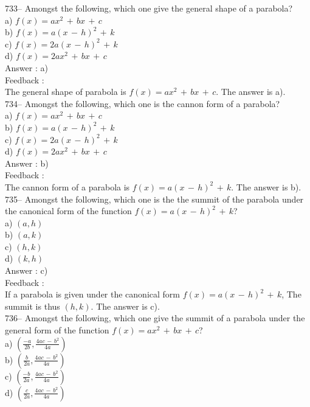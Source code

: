 \documentclass[letterpaper, 12pt]{article}
\begin{document}
733-- Amongst the following, which one give the general shape of a parabola?\\
a) $f(x)=ax^{2}\,+\,bx\,+\,c$\\
b) $f(x)=a(x\,-\,h)^{2}\,+\,k$\\
c) $f(x)=2a(x\,-\,h)^{2}\,+\,k$\\
d) $f(x)=2ax^{2}\,+\,bx\,+\,c$\\

Answer : a)\\

Feedback : \\
The general shape of parabola is $f(x)=ax^{2}\,+\,bx\,+\,c$. The answer is a).\\

734-- Amongst the following, which one is the cannon form of a parabola?\\
a) $f(x)=ax^{2}\,+\,bx\,+\,c$\\
b) $f(x)=a(x\,-\,h)^{2}\,+\,k$\\
c) $f(x)=2a(x\,-\,h)^{2}\,+\,k$\\
d) $f(x)=2ax^{2}\,+\,bx\,+\,c$\\

Answer : b)\\

Feedback : \\
The cannon form of a parabola is $f(x)=a(x\,-\,h)^{2}\,+\,k$. The answer is b).\\

735-- Amongst the following, which one is the the summit of the parabola under the canonical form of the function 
$f(x)=a(x\,-\,h)^{2}\,+\,k$?\\
a) $(a,h)$\\
b) $(a,k)$\\
c) $(h,k)$\\
d) $(k,h)$\\

Answer : c)\\

Feedback : \\
If a parabola is given under the canonical form 
$f(x)=a(x\,-\,h)^{2}\,+\,k$, The summit is thus $(h,k)$.  The answer is
c).\\

736-- Amongst the following, which one give the summit of a parabola under the general form of the function
$f(x)=ax^{2}\,+\,bx\,+\,c$?\\
a) $(\frac{-a}{2b},\frac{4ac\,-\,b^{2}}{4a})$\\[2mm]
b) $(\frac{b}{2a},\frac{4ac\,-\,b^{2}}{4a})$\\[2mm]
c) $(\frac{-b}{2a},\frac{4ac\,-\,b^{2}}{4a})$\\[2mm]
d) $(\frac{c}{2a},\frac{4ac\,-\,b^{2}}{4a})$\\
\end{document}
